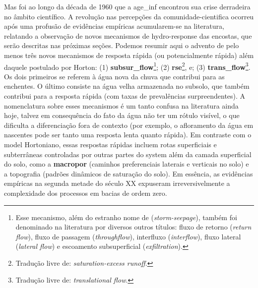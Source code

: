\documentclass[./main.tex]{subfiles}
\begin{document}
\par Mas foi ao longo da década de 1960 que a \gls{age_inf} encontrou sua crise derradeira no âmbito científico. A revolução nas percepções da \gls{comunidade-cientifica} ocorreu após uma profusão de evidências empíricas acumularem-se na literatura, relatando a observação de novos mecanismos de \gls{hydro-response} das encostas, que serão descritas nas próximas seções. Podemos resumir aqui o advento de pelo menos três novos mecanismos de resposta rápida (ou potencialmente rápida) além daquele postulado por Horton: (1) \textbf{\gls{subsur_flow}}\footnote{Esse mecanismo, além do estranho nome de  (\textit{storm-seepage}), também foi denominado na literatura por diversos outros títulos: fluxo de retorno (\textit{return flow}), fluxo de passagem (\textit{throughflow}), interfluxo (\textit{interflow}), fluxo lateral (\textit{lateral flow}) e escoamento subsuperficial (\textit{exfiltration}).}; (2) \textbf{\gls{rse}}\footnote{Tradução livre de: \textit{saturation-excess runoff}.}, e; (3) \textbf{\gls{trans_flow}}\footnote{Tradução livre de: \textit{translational flow}.}. Os dois primeiros se referem à água nova da chuva que contribui para as enchentes. O último consiste na água velha armazenada no subsolo, que também contribui para a resposta rápida (com taxas de prevalências surpreendentes). A nomenclatura sobre esses mecanismos é um tanto confusa na literatura ainda hoje, talvez em consequência do fato da água não ter um rótulo visível, o que dificulta a diferenciação fora de contexto (por exemplo, o afloramento da água em nascentes pode ser tanto uma resposta lenta quanto rápida). Em contraste com o \gls{model} Hortoniano, essas respostas rápidas incluem rotas superficiais e subterrâneas controladas por outras partes do \gls{system} além da camada superficial do solo, como a \textbf{\gls{macropor}} (caminhos preferenciais laterais e verticais no solo) e a topografia (padrões dinâmicos de saturação do solo). Em essência, as evidências empíricas na segunda metade do século XX expuseram irreversivelmente a complexidade dos processos em bacias de ordem zero. 
\end{document}
